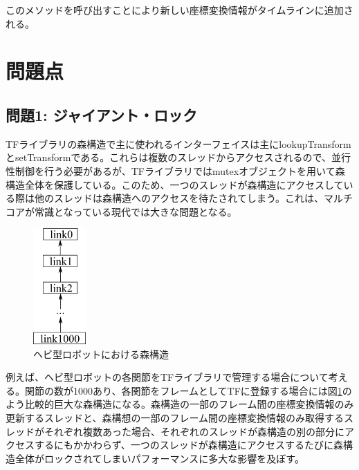 \documentclass[a4paper]{jreport}	%
\begin{document}
このメソッドを呼び出すことにより新しい座標変換情報がタイムラインに追加される。



\section{問題点}
\subsection*{問題1: ジャイアント・ロック}
TFライブラリの森構造で主に使われるインターフェイスは主にlookupTransformとsetTransformである。これらは複数のスレッドからアクセスされるので、並行性制御を行う必要があるが、TFライブラリではmutexオブジェクトを用いて森構造全体を保護している。このため、一つのスレッドが森構造にアクセスしている際は他のスレッドは森構造へのアクセスを待たされてしまう。これは、マルチコアが常識となっている現代では大きな問題となる。

\begin{figure}[h] 
\centering
\includegraphics[width=2cm]{snake}	
\caption{ヘビ型ロボットにおける森構造}
\label{fig:snake}
\end{figure}

例えば、ヘビ型ロボットの各関節をTFライブラリで管理する場合について考える。関節の数が1000あり、各関節をフレームとしてTFに登録する場合には図\ref{fig:snake}のよう比較的巨大な森構造になる。森構造の一部のフレーム間の座標変換情報のみ更新するスレッドと、森構想の一部のフレーム間の座標変換情報のみ取得するスレッドがそれぞれ複数あった場合、それぞれのスレッドが森構造の別の部分にアクセスするにもかかわらず、一つのスレッドが森構造にアクセスするたびに森構造全体がロックされてしまいパフォーマンスに多大な影響を及ぼす。
\end{document}
